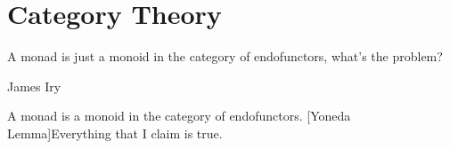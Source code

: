 \documentclass[12pt]{report}
\begin{document}
    \chapter{Category Theory}\label{sec:simps}
    \epigraph{A monad is just a monoid in the category of endofunctors, what's the problem?}{James Iry}
    A monad is a monoid in the category of endofunctors.
    [Yoneda Lemma]{Everything that I claim is true.}
\end{document}
